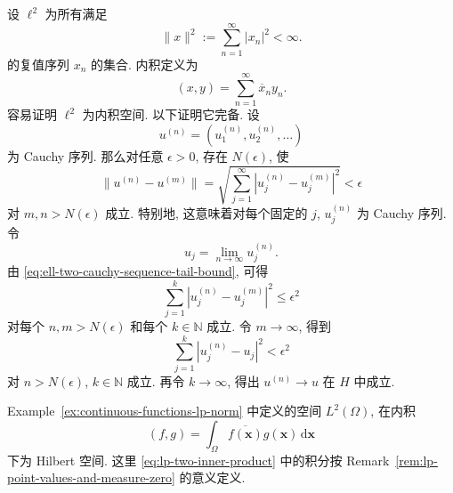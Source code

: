 \begin{Example}
\label{ex:ell-two-hilbert-space}
设 $\ell^2$ 为所有满足
\begin{equation}\label{eq:ell-two-sequence-square-norm}
\|x\|^2:=\sum_{n=1}^\infty|x_n|^2<\infty.
\end{equation}
的复值序列 $x_n$ 的集合. 内积定义为
\begin{equation}\label{eq:ell-two-sequence-inner-product}
(x,y)=\sum_{n=1}^\infty\overline x_ny_n.
\end{equation}
容易证明 $\ell^2$ 为内积空间. 以下证明它完备. 设
\begin{equation}\label{eq:ell-two-cauchy-sequence-components}
u^{(n)}=(u_1^{(n)},u_2^{(n)},\ldots)
\end{equation}
为 Cauchy 序列. 那么对任意 $\epsilon>0$, 存在 $N(\epsilon)$, 使
\begin{equation}\label{eq:ell-two-cauchy-sequence-tail-bound}
\|u^{(n)}-u^{(m)}\|=\sqrt{\sum_{j=1}^\infty|u_j^{(n)}-u_j^{(m)}|^2}<\epsilon
\end{equation}
对 $m,n>N(\epsilon)$ 成立. 特别地, 这意味着对每个固定的 $j$, $u_j^{(n)}$ 为 Cauchy 序列. 令
\begin{equation}\label{eq:ell-two-coordinatewise-limit}
u_j=\lim_{n\to\infty}u_j^{(n)}.
\end{equation}
由 \eqref{eq:ell-two-cauchy-sequence-tail-bound}, 可得
\begin{equation}\label{eq:ell-two-finite-partial-sum-cauchy-bound}
\sum_{j=1}^k|u_j^{(n)}-u_j^{(m)}|^2\leq\epsilon^2
\end{equation}
对每个 $n,m>N(\epsilon)$ 和每个 $k\in\mathbb{N}$ 成立. 令 $m\to\infty$, 得到
\begin{equation}\label{eq:ell-two-finite-partial-sum-limit-bound}
\sum_{j=1}^k|u_j^{(n)}-u_j|^2<\epsilon^2
\end{equation}
对 $n>N(\epsilon)$, $k\in\mathbb{N}$ 成立. 再令 $k\to\infty$, 得出 $u^{(n)}\to u$ 在 $H$ 中成立.
\end{Example}

\begin{Example}
\label{ex:lp-two-hilbert-space}
Example~\ref{ex:continuous-functions-lp-norm} 中定义的空间 $L^2(\Omega)$, 在内积
\begin{equation}\label{eq:lp-two-inner-product}
(f,g)=\int_\Omega\overline{f(\bm{x})}g(\bm{x})\,\mathrm{d}\bm{x}
\end{equation}
下为 Hilbert 空间. 这里 \eqref{eq:lp-two-inner-product} 中的积分按 Remark~\ref{rem:lp-point-values-and-measure-zero} 的意义定义.
\end{Example}

